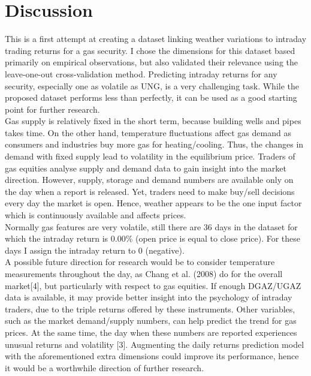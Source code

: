 \documentclass[conference,letterpaper]{IEEEtran}
\begin{document}
\section{Discussion}
This is a first attempt at creating a dataset linking weather variations to intraday trading returns for a gas security. I chose the dimensions for this
dataset based primarily on empirical observations, but also validated their relevance using the leave-one-out cross-validation method. Predicting intraday
returns for any security, especially one as volatile as UNG, is a very challenging task. While the proposed dataset performs less than perfectly, it can be
used as a good starting point for further research. \\
\indent Gas supply is relatively fixed in the short term, because building wells and pipes takes time. On the other hand,
temperature fluctuations affect gas demand as consumers and industries buy more gas for heating/cooling. Thus, the changes in demand with fixed
supply lead to volatility in the equilibrium price. Traders of gas equities analyse supply and demand data to gain insight into the market direction. However,
supply, storage and demand numbers are available only on the day when a report is released. Yet, traders need to make buy/sell decisions every day the market
is open. Hence, weather appears to be the one input factor which is continuously available and affects prices. \\
Normally gas features are very volatile, still there are 36 days in the dataset
for which the intraday return is 0.00\% (open price is equal to close price). For these
days I assign the intraday return to 0 (negative).\\
\indent A possible future direction for research would be to consider temperature measurements throughout the day, as Chang et al. (2008) do for the overall market[4], but
particularly with respect to gas equities. If enough DGAZ/UGAZ data is available, it may provide better insight into the psychology of intraday traders, due to the triple
returns offered by these instruments. Other variables, such as the market demand/supply numbers, can help predict the trend for gas prices. At the same time, the
day when these numbers are reported experiences unusual returns and volatility [3]. Augmenting the daily returns prediction model with the aforementioned extra
dimensions could improve its performance, hence it would be a worthwhile direction of further research. \\
\end{document}
